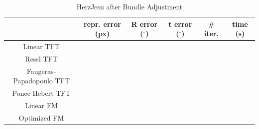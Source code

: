 \begin{table}[htbp]
  \centering
  \caption{HerzJesu after Bundle Adjustment}
  \label{tab:HerzJesuBA}
  \begin{tabular}{|*{6}{c}|}
    \hline
     & repr. error (px) & R error ($^{\circ}$) & t error ($^{\circ}$) & \# iter. & time (s)\\
    \hline
    Linear TFT & & & & & \\
    \hline
    Ressl TFT & & & & & \\
    \hline
    Faugeras-Papadopoulo TFT & & & & & \\
    \hline
    Ponce-Hebert TFT & & & & & \\
    \hline
    Linear FM & & & & & \\
    \hline
    Optimized FM & & & & & \\
    \hline
  \end{tabular}
\end{table}
